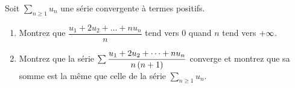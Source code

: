 \begin{corr}
\end{corr}

\begin{exosss}[Exercice 22]
Soit \(\sum_{n\geq1}u_n\) une série convergente à termes positifs.

\begin{enumerate}
    \item Montrez que \(\dfrac{u_1+2u_2+\dots+nu_n}{n}\) tend vers \(0\) quand \(n\) tend vers \(+\infty\). \\
    \item Montrez que la série \(\sum\dfrac{u_1+2u_2+\dots+nu_n}{n\left(n+1\right)}\) converge et montrez que sa somme est la même que celle de la série \(\sum_{n\geq1}u_n\).
\end{enumerate}
\end{exosss}

\begin{corr}
\end{corr}
